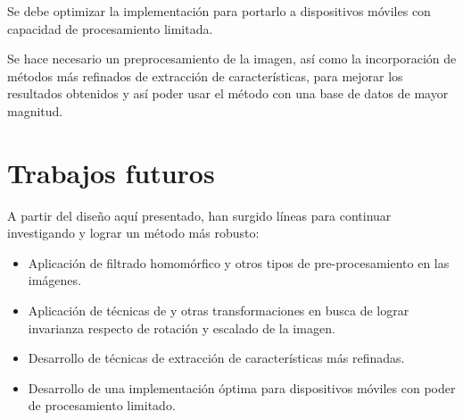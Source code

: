 \documentclass[conference,a4paper,10pt,oneside,final]{tfmpd}
\begin{document}
Se debe optimizar la implementación para portarlo a dispositivos móviles
con capacidad de procesamiento limitada.

Se hace necesario un preprocesamiento de la imagen, así como la incorporación
de métodos más refinados de extracción de características, para mejorar los
resultados obtenidos y así poder usar el método con una base de datos de
mayor magnitud.
%
%
%
%
\section{Trabajos futuros}
A partir del diseño aquí presentado, han surgido líneas para continuar
investigando y lograr un método más robusto:
\begin{itemize}
\item Aplicación de filtrado homomórfico y otros tipos de
      pre-procesamiento en las imágenes.
\item Aplicación de técnicas de  y otras transformaciones en busca
      de lograr invarianza respecto de rotación y escalado de la imagen.
\item Desarrollo de técnicas de extracción de características más {refinadas}.
\item Desarrollo de una implementación óptima para dis\-po\-si\-ti\-vos
      móviles con poder de procesamiento limitado.
\end{itemize}
\nocite{*}


\end{document}
